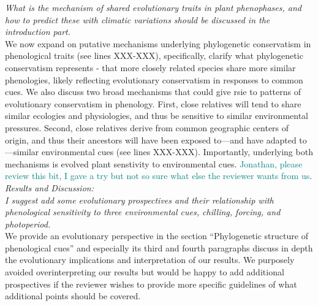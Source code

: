 \documentclass[11pt]{article}
\begin{document}
\emph{What is the mechanism of shared evolutionary traits in plant phenophases, and how to predict these with climatic variations should be discussed in the introduction part.}\\
We now expand on putative mechanisms underlying phylogenetic conservatism in phenological traits (see lines XXX-XXX), specifically, clarify what phylogenetic conservatism represents -  that more closely related species share more similar phenologies, likely reflecting evolutionary conservatism in responses to common cues. We also discuss two broad mechanisms that could give rsie to patterns of evolutionary conservatism in phenology. First, close relatives will tend to share similar ecologies and physiologies, and thus be sensitive to similar environmental pressures. Second, close relatives derive from common geographic centers of origin, and thus their ancestors will have been exposed to---and have adapted to---similar environmental cues (see lines XXX-XXX). Importantly, underlying both mechanisms is evolved plant senstivity to environmental cues.
\textcolor{teal}{Jonathan, please review this bit, I gave a try but not so sure what else the reviewer wants from us}.\\


\emph{Results and Discussion:}\\
\emph{I suggest add some evolutionary prospectives and their relationship with phenological sensitivity to three environmental cues, chilling, forcing, and photoperiod.}\\
We provide an evolutionary perspective in the section ``Phylogenetic structure of phenological cues'' and especially its third and fourth paragraphs discuss in depth the evolutionary implications and interpretation of our results. We purposely avoided overinterpreting our results but would be happy to add additional prospectives if the reviewer wishes to provide more specific guidelines of what additional points should be covered.\\
\end{document}
